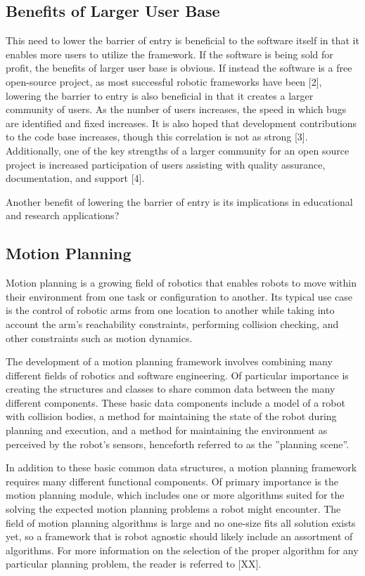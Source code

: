 \documentclass[10pt,journal,compsoc]{joser1}
\begin{document}
{\subsection{Benefits of Larger User Base}

This need to lower the barrier of entry is beneficial to the software itself in that it enables more users to utilize the framework. If the software is being sold for profit, the benefits of larger user base is obvious. If instead the software is a free open-source project, as most successful robotic frameworks have been [2], lowering the barrier to entry is also beneficial in that it creates a larger community of users. As the number of users increases, the speed in which bugs are identified and fixed increases. It is also hoped that development contributions to the code base increases, though this correlation is not as strong [3]. Additionally, one of the key strengths of a larger community for an open source project is increased participation of users assisting with quality assurance, documentation, and support [4].

Another benefit of lowering the barrier of entry is its implications in educational and research applications?

\subsection{Motion Planning}

Motion planning is a growing field of robotics that enables robots to move within their environment from one task or configuration to another. Its typical use case is the control of robotic arms from one location to another while taking into account the arm's reachability constraints, performing collision checking, and other constraints such as motion dynamics. 

The development of a motion planning framework involves combining many different fields of robotics and software engineering. Of particular importance is creating the structures and classes to share common data between the many different components. These basic data components include a model of a robot with collision bodies, a method for maintaining the state of the robot during planning and execution, and a method for maintaining the environment as perceived by the robot's sensors, henceforth referred to as the ''planning scene''. 

In addition to these basic common data structures, a motion planning framework requires many different functional components. Of primary importance is the motion planning module, which includes one or more algorithms suited for the solving the expected motion planning problems a robot might encounter. The field of motion planning algorithms is large and no one-size fits all solution exists yet, so a framework that is robot agnostic should likely include an assortment of algorithms. For more information on the selection of the proper algorithm for any particular planning problem, the reader is referred to [XX].

}
\end{document}
